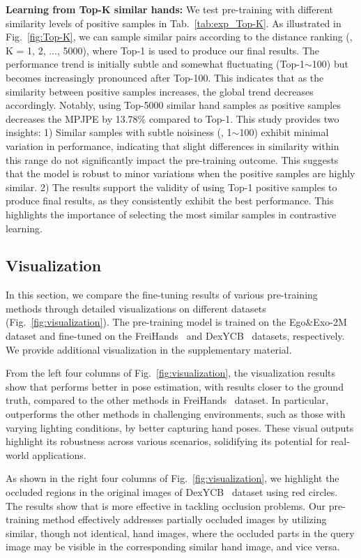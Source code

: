 \textbf{Learning from Top-K similar hands:}
We test pre-training with different similarity levels of positive samples in Tab.~\ref{tab:exp_Top-K}. As illustrated in Fig.~\ref{fig:Top-K}, we can sample similar pairs according to the distance ranking (\eg, K = 1, 2, ..., 5000), where Top-1 is used to produce our final results. The performance trend is initially subtle and somewhat fluctuating (Top-1$\sim$100) but becomes increasingly pronounced after Top-100. This indicates that as the similarity between positive samples increases, the global trend decreases accordingly. Notably, using Top-5000 similar hand samples as positive samples decreases the MPJPE by 13.78\% compared to Top-1. This study provides two insights: 1) Similar samples with subtle noisiness (\eg, 1$\sim$100) exhibit minimal variation in performance, indicating that slight differences in similarity within this range do not significantly impact the pre-training outcome. This suggests that the model is robust to minor variations when the positive samples are highly similar. 2) The results support the validity of using Top-1 positive samples to produce final results, as they consistently exhibit the best performance. This highlights the importance of selecting the most similar samples in contrastive learning.

\subsection{Visualization}\label{sec:exp_vis}
In this section, we compare the fine-tuning results of various pre-training methods through detailed visualizations on different datasets (Fig.~\ref{fig:visualization}). The pre-training model is trained on the Ego\&Exo-2M dataset and fine-tuned on the FreiHands~\citep{zimmermann:iccv19} and DexYCB~\citep{chao:cvpr21} datasets, respectively.
We provide additional visualization in the supplementary material.

From the left four columns of Fig.~\ref{fig:visualization}, the visualization results show that \Ours performs better in pose estimation, with results closer to the ground truth, compared to the other methods in FreiHands~\citep{zimmermann:iccv19} dataset. In particular, \Ours outperforms the other methods in challenging environments, such as those with varying lighting conditions, by better capturing hand poses. These visual outputs highlight its robustness across various scenarios, solidifying its potential for real-world applications.

As shown in the right four columns of Fig.~\ref{fig:visualization}, we highlight the occluded regions in the original images of DexYCB~\citep{chao:cvpr21} dataset using red circles. The results show that \Ours is more effective in tackling occlusion problems. Our pre-training method effectively addresses partially occluded images by utilizing similar, though not identical, hand images, where the occluded parts in the query image may be visible in the corresponding similar hand image, and vice versa.

